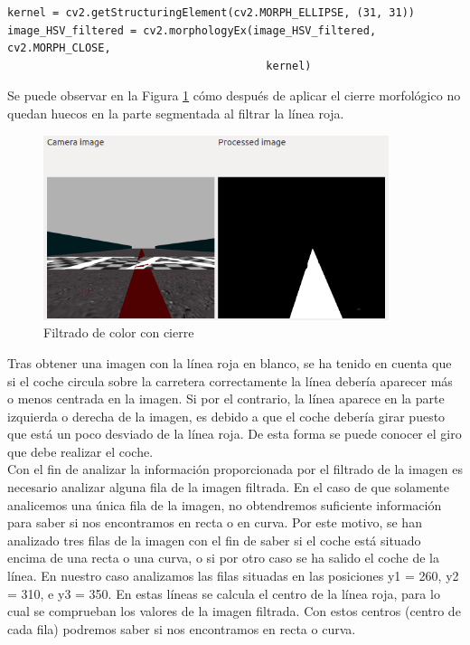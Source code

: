 \vspace{10pt}
\begin{lstlisting}
kernel = cv2.getStructuringElement(cv2.MORPH_ELLIPSE, (31, 31))
image_HSV_filtered = cv2.morphologyEx(image_HSV_filtered, cv2.MORPH_CLOSE,
                                        kernel)
\end{lstlisting}
\vspace{20pt}

Se puede observar en la Figura \ref{fig.cierre} cómo después de aplicar el cierre morfológico no quedan huecos en la parte segmentada al filtrar la línea roja. \\

\begin{figure}
  \begin{center}
    \includegraphics[width=0.9\textwidth]{figures/Infraestructura/filtro_cierre.png}
		\caption{Filtrado de color con cierre}
		\label{fig.cierre}
		\end{center}
\end{figure}

Tras obtener una imagen con la línea roja en blanco, se ha tenido en cuenta que si el coche circula sobre la carretera correctamente la línea debería aparecer más o menos centrada en la imagen. Si por el contrario, la línea aparece en la parte izquierda o derecha de la imagen, es debido a que el coche debería girar puesto que está un poco desviado de la línea roja. De esta forma se puede conocer el giro que debe realizar el coche.\\

Con el fin de analizar la información proporcionada por el filtrado de la imagen es necesario analizar alguna fila de la imagen filtrada. En el caso de que solamente analicemos una única fila de la imagen, no obtendremos suficiente información para saber si nos encontramos en recta o en curva. Por este motivo, se han analizado tres filas de la imagen con el fin de saber si el coche está situado encima de una recta o una curva, o si por otro caso se ha salido el coche de la línea. En nuestro caso analizamos las filas situadas en las posiciones y1 = 260, y2 = 310, e y3 = 350. En estas líneas se calcula el centro de la línea roja, para lo cual se comprueban los valores de la imagen filtrada. Con estos centros (centro de cada fila) podremos saber si nos encontramos en recta o curva.\\


